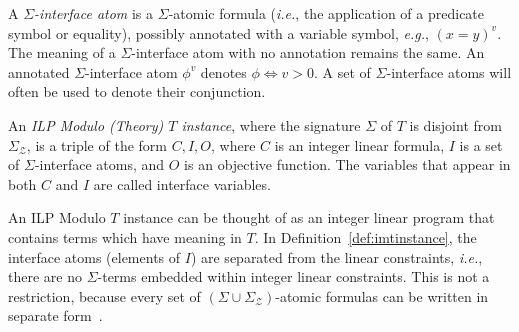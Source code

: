 \documentclass{llncs}
\newcommand{\comment}[1]{}
\newcommand{\ie}[0]{\emph{i.e.}, }
\newcommand{\eg}[0]{\emph{e.g.}, }
\newcommand{\Z}[0]{\ensuremath{\mathcal{Z}}}
\newcommand{\SigmaZ}[0]{\ensuremath{\Sigma_{\mathcal{Z}}}}
\begin{document}
\comment{Whenever convenient, we will be viewing first-order models as
  integer assignments; this is possible, because for every first-order
  model $M$ of \Z{} and for every variable symbol $v$, there is a
  unique integer constant $c$ such that $M \models v = c$.}

A \emph{$\Sigma$-interface atom} is a $\Sigma$-atomic formula (\ie the
application of a predicate symbol or equality), possibly annotated
with a variable symbol, \eg $(x=y)^v$. The meaning of a
$\Sigma$-interface atom with no annotation remains the same. An
annotated $\Sigma$-interface atom $\phi^v$ denotes $\phi
\Leftrightarrow v > 0$. A set of $\Sigma$-interface atoms will often
be used to denote their conjunction. \comment{We will assume that for
  every interface atom of the form $x = y$ or $(x = y)^v$ where $x$,
  $y$, and $v$ are variable symbols, at most one of $x$ and $y$
  appears in integer linear constraints; the opposite would defy the
  purpose of interface atoms.}

\begin{definition}
  An \emph{ILP Modulo (Theory) $T$ instance}, where the signature
  $\Sigma$ of $T$ is disjoint from \SigmaZ{}, is a triple of the form
  $C, I, O$, where $C$ is an integer linear formula, $I$ is a set of
  $\Sigma$-interface atoms, and $O$ is an objective function. The
  variables that appear in both $C$ and $I$ are called interface
  variables.
  \label{def:imtinstance}
\end{definition}

An ILP Modulo $T$ instance can be thought of as an integer linear
program that contains terms which have meaning in $T$. In
Definition~\ref{def:imtinstance}, the interface atoms (elements of
$I$) are separated from the linear constraints, \ie there are no
$\Sigma$-terms embedded within integer linear constraints.  This is
not a restriction, because every set of $(\Sigma \cup
\SigmaZ{})$-atomic formulas can be written in separate
form~\cite[``Variable Abstraction'']{combiningdp}.
\end{document}
